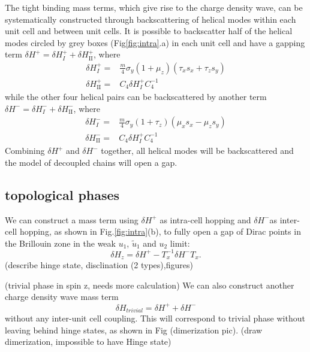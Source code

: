 The tight binding mass terms, which give rise to the charge density wave, can be systematically constructed through backscattering of helical modes within each unit cell and between unit cells. It is possible to backscatter half of the helical modes circled by grey boxes (Fig\ref{fig:intra}.a) in each unit cell and have a gapping term $\delta H^+=\delta H_I^++\delta H_{\mathrm{II}}^+ $, where
\begin{equation}
\begin{split}
    \delta H_I^+ =& \frac{m}{4}\sigma_y(1+\mu_z)(\tau_xs_x+\tau_zs_y)
    \\
    \delta H_{\mathrm{II}}^+ =&C_4\delta H_I^+C_4^{-1}
\end{split}
\end{equation}
while the other four helical pairs can be backscattered by another term $\delta H^-=\delta H_I^-+\delta H_{\mathrm{II}}^-  $, where \begin{equation}
\begin{split}
 \delta H_I^- =& \frac{m}{4}\sigma_y(1+\tau_z)(\mu_xs_x-\mu_zs_y)
    \\
    \delta H_{\mathrm{II}}^- =&C_4\delta H_I^+C_4^{-1}
\end{split}
\end{equation}Combining $\delta H^+$ and $\delta H^-$ together, all helical modes will be backscattered and the model of decoupled chains will open a gap.  

\subsection{topological phases}
We can construct a mass term using $\delta H^+$ as intra-cell hopping and $\delta H^-$as inter-cell hopping, as shown in Fig.\ref{fig:intra}(b), to fully open a gap of Dirac points in the Brillouin zone in the weak $u_1$, $\tilde{u}_1$ and $u_2$ limit:
\begin{equation}
    \delta H_z = \delta H^+-T_x^{-1}\delta H^- T_x. \label{z_gapping_nontrivial}
\end{equation}{\color{red}(describe hinge state, disclination (2 types),figures)}

{\color{red} (trivial phase in spin z, needs more calculation)} We can also construct another charge density wave mass term
\begin{equation}
    \delta H_{trivial} = \delta H^++\delta H^- \label{trivial_gapping}
\end{equation}
without any inter-unit cell coupling. This will correspond to trivial phase without leaving behind hinge states, as shown in Fig (dimerization pic). {\color{red}(draw dimerization, impossible to have Hinge state)}

